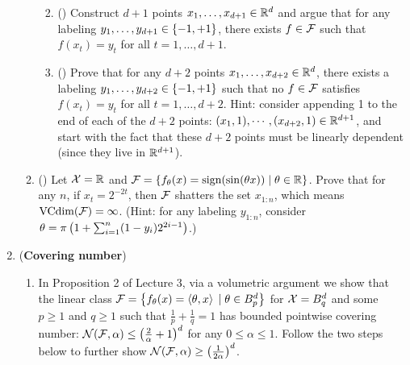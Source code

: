 \documentclass{article}
\begin{document}
\begin{enumerate}[leftmargin=*,align=left]
\begin{enumerate}[leftmargin=*,align=left]
\begin{enumerate}[leftmargin=*,align=left]
\vspace{5pt}
\item () 
Construct $d+1$ points $x_1, \ldots, x_{d+1} \in \mathbb{R}^d$ and argue that for any labeling $y_1, \ldots, y_{d+1} \in \left\{-1,+1\right\}$, there exists $f \in {\mathcal{F}}$ such that $f(x_t) = y_t$ for all $t = 1, \ldots, d+1$. \\


\vspace{5pt}
\item () 
Prove that for any $d+2$ points $x_1, \ldots, x_{d+2} \in \mathbb{R}^d$, there exists a labeling $y_1, \ldots, y_{d+2} \in \left\{-1,+1\right\}$ such that no $f\in{\mathcal{F}}$ satisfies $f(x_t) = y_t$ for all $t = 1, \ldots, d+2$. 
Hint: consider appending 1 to the end of each of the $d+2$ points: $(x_1, 1), \cdots, (x_{d+2}, 1) \in\mathbb{R}^{d+1}$, and start with the fact that these $d+2$ points must be linearly dependent (since they live in $\mathbb{R}^{d+1}$).
\\


\end{enumerate}

\newpage
\vspace{5pt}
\item () 
Let ${\mathcal{X}} = \mathbb{R}$ and ${\mathcal{F}} = \left\{f_\theta(x) = {\text{\rm sign}}(\sin(\theta x)) \;|\; \theta \in \mathbb{R}\right\}$.
Prove that for any $n$, if $x_t = 2^{-2t}$, then ${\mathcal{F}}$ shatters the set $x_{1:n}$,
which means ${\text{\rm VCdim}}({\mathcal{F}}) = \infty$.
(Hint: for any labeling $y_{1:n}$, consider $\theta = \pi\left(1+ \sum_{i=1}^n (1-y_i)2^{2i-1}\right)$.) \\

\end{enumerate}
\newpage


\item ({\bf Covering number})
\begin{enumerate}[leftmargin=*,align=left]
\vspace{5pt}
\item In Proposition 2 of Lecture 3, via a volumetric argument we show that the linear class ${\mathcal{F}} = \left\{f_\theta(x) = \left\langle \theta,x \right\rangle \;|\; \theta \in B^d_p\right\}$ for ${\mathcal{X}} = B^d_q$ and some $p\geq 1$ and $q\geq 1$ such that $\frac{1}{p}+\frac{1}{q}=1$ has bounded pointwise covering number: ${\mathcal{N}}({\mathcal{F}}, \alpha) \leq \left(\frac{2}{\alpha}+1\right)^d$ for any $0\leq \alpha \leq 1$.
Follow the two steps below to further show ${\mathcal{N}}({\mathcal{F}}, \alpha) \geq \left(\frac{1}{2\alpha}\right)^d$.


\end{enumerate}
\end{enumerate}
\end{document}
